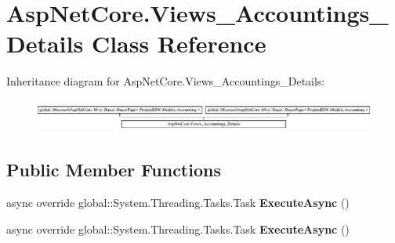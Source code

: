 \hypertarget{class_asp_net_core_1_1_views___accountings___details}{}\section{Asp\+Net\+Core.\+Views\+\_\+\+Accountings\+\_\+\+Details Class Reference}
\label{class_asp_net_core_1_1_views___accountings___details}
Inheritance diagram for Asp\+Net\+Core.\+Views\+\_\+\+Accountings\+\_\+\+Details\+:\begin{figure}[H]
\begin{center}
\leavevmode
\includegraphics[height=1.068702cm]{class_asp_net_core_1_1_views___accountings___details}
\end{center}
\end{figure}
\subsection*{Public Member Functions}
\begin{DoxyCompactItemize}
\item 
\mbox{\label{class_asp_net_core_1_1_views___accountings___details_a1312c037e13ffe1d811a6e1858bba349}} 
async override global\+::\+System.\+Threading.\+Tasks.\+Task {\bfseries Execute\+Async} ()
\item 
\mbox{\label{class_asp_net_core_1_1_views___accountings___details_a1312c037e13ffe1d811a6e1858bba349}} 
async override global\+::\+System.\+Threading.\+Tasks.\+Task {\bfseries Execute\+Async} ()
\end{DoxyCompactItemize}
